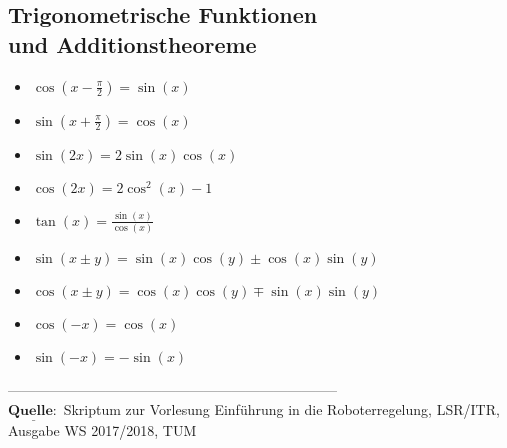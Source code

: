 \documentclass[a4paper,landscape,6pt]{article}
\newcommand{\ma}[1]{\ensuremath{\boldsymbol {#1}}}								%
\begin{document}
\begin{multicols}{3}
\subsection*{Trigonometrische Funktionen \\ und Additionstheoreme}
\begin{itemize}
	\item $\cos (x - \frac{\pi}{2}) = \sin(x)$
	\item $\sin (x + \frac{\pi}{2}) = \cos(x)$
	\item $\sin (2x) = 2 \sin (x) \cos (x) $ 
	\item $\cos (2x) = 2\cos^2 (x) - 1$
	\item $\tan(x) = \frac{\sin(x)}{\cos(x)}$
	\item $\sin ( x \pm y ) = \sin (x) \cos (y) \pm \cos (x) \sin (y)$
	\item $\cos ( x \pm y ) = \cos (x) \cos (y) \mp \sin (x) \sin (y)$
	\item $\cos (-x) = \cos(x)$
	\item $\sin(-x) = -\sin(x)$
\end{itemize}
-----------------------------------------------------------------------\\
\ma{\underline{Quelle:}} Skriptum zur Vorlesung Einführung in die Roboterregelung, LSR/ITR, Ausgabe WS 2017/2018, TUM
\newpage
\end{multicols}
\end{document}
